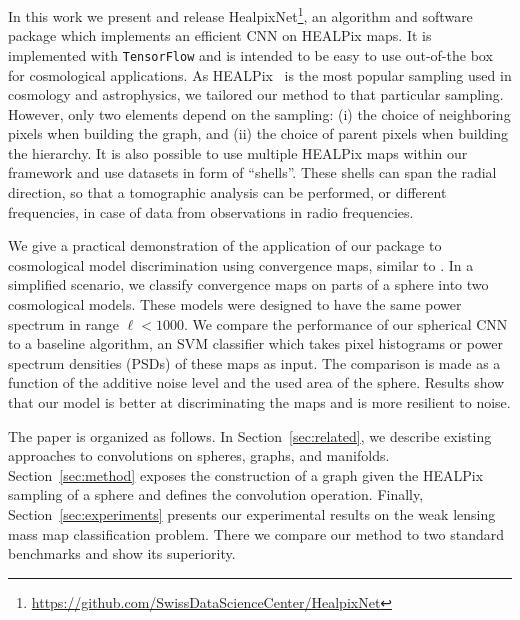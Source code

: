 \documentclass[final,twocolumn,3p,times,authoryear]{elsarticle}
\newcommand{\nati}[1]{{\color[rgb]{.1,.6,.1}{#1}}}
\newcommand{\secref}[1]{Section~\ref{sec:#1}}
\newcommand{\1}{\b{1}}              %
\newcommand{\0}{\b{0}}              %
\newcommand{\pkg}[1]{\texttt{#1}}
\begin{document}
In this work we present and release HealpixNet\footnote{\url{https://github.com/SwissDataScienceCenter/HealpixNet}}, an algorithm and software package which implements an efficient CNN on HEALPix maps. It is implemented with \pkg{TensorFlow} \citep{abadi2016tensorflow} and is intended to be easy to use out-of-the box for cosmological applications.
As HEALPix~\citep{gorski2005healpix} is the most popular sampling used in cosmology and astrophysics, we tailored our method to that particular sampling. However, only two elements depend on the sampling: (i) the choice of neighboring pixels when building the graph, and (ii) the choice of parent pixels when building the hierarchy.
It is also possible to use multiple HEALPix maps within our framework and use datasets in form of ``shells''. These shells can span the radial direction, so that a tomographic analysis can be performed, or different frequencies, in case of data from observations in radio frequencies. \nati{I do not know about that last point. Yes we can do it. But a) we did not do it and b) the filter will be spherical in all directions includeding the radial one... I am not sure this is a disirable features.}


We give a practical demonstration of the application of our package to cosmological model discrimination using convergence maps, similar to \citep{schmelze2017cosmologicalmodel}.
In a simplified scenario, we classify convergence maps on parts of a sphere into two cosmological models.
These models were designed to have the same power spectrum in range $\ell < 1000$.
We compare the performance of our spherical CNN to a baseline algorithm, an SVM classifier which takes pixel histograms or power spectrum densities (PSDs) of these maps as input.
The comparison is made as a function of the additive noise level and the used area of the sphere. Results show that our model is better at discriminating the maps and is more resilient to noise.

The paper is organized as follows.
In \secref{related}, we describe existing approaches to convolutions on spheres, graphs, and manifolds.
\secref{method} exposes the construction of a graph given the HEALPix sampling of a sphere and defines the convolution operation.
Finally, \secref{experiments} presents our experimental results on the weak lensing mass map classification problem. There we compare our method to two standard benchmarks and show its superiority.
\end{document}
